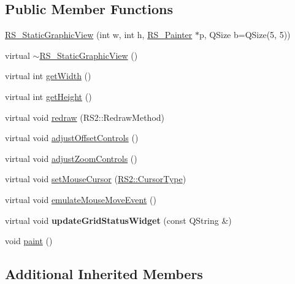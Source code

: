 \subsection*{Public Member Functions}
\begin{DoxyCompactItemize}
\item 
\hyperlink{classRS__StaticGraphicView_ae3c48aff55516fdfb2f4adf7ce293479}{R\-S\-\_\-\-Static\-Graphic\-View} (int w, int h, \hyperlink{classRS__Painter}{R\-S\-\_\-\-Painter} $\ast$p, Q\-Size b=Q\-Size(5, 5))
\item 
virtual \hyperlink{classRS__StaticGraphicView_aa8d2ab183db2c04e0bce85e1fb1588d0}{$\sim$\-R\-S\-\_\-\-Static\-Graphic\-View} ()
\item 
virtual int \hyperlink{classRS__StaticGraphicView_ae4aa91a2b40c4bbd5575da0dd37d39a8}{get\-Width} ()
\item 
virtual int \hyperlink{classRS__StaticGraphicView_ae07f0d96c25dffb695dfb1647a684cb3}{get\-Height} ()
\item 
virtual void \hyperlink{classRS__StaticGraphicView_af9d0538d36ae04d02eea24486d99b636}{redraw} (R\-S2\-::\-Redraw\-Method)
\item 
virtual void \hyperlink{classRS__StaticGraphicView_af43aea5e7f21072089f223b6ef227533}{adjust\-Offset\-Controls} ()
\item 
virtual void \hyperlink{classRS__StaticGraphicView_aadc4f5560267cd7e4c9ea51c7faea576}{adjust\-Zoom\-Controls} ()
\item 
virtual void \hyperlink{classRS__StaticGraphicView_a752ef5e5313de1e9c4f6f1f4ceaea9d9}{set\-Mouse\-Cursor} (\hyperlink{classRS2_a15aa1c4c60c63de4dc688f0bcb43548d}{R\-S2\-::\-Cursor\-Type})
\item 
virtual void \hyperlink{classRS__StaticGraphicView_a3bc6dc81ab671205635625df45a2bd2a}{emulate\-Mouse\-Move\-Event} ()
\item 
\hypertarget{classRS__StaticGraphicView_aa3432e04f9f999dc02d2fe01fc3a6b1b}{virtual void {\bfseries update\-Grid\-Status\-Widget} (const Q\-String \&)}\label{classRS__StaticGraphicView_aa3432e04f9f999dc02d2fe01fc3a6b1b}

\item 
void \hyperlink{classRS__StaticGraphicView_ad1596200a84c0b63b9a63963187efb48}{paint} ()
\end{DoxyCompactItemize}
\subsection*{Additional Inherited Members}


